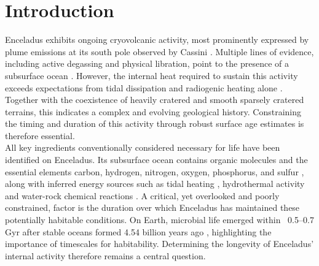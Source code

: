 \documentclass[preprint,11pt,3p,times,authoryear]{elsarticle}
\begin{document}
\linenumbers

\section{Introduction}
\label{intro}

Enceladus exhibits ongoing cryovolcanic activity, most prominently expressed by plume emissions at its south pole observed by Cassini \citep{Porco2004,Spencer2006}. Multiple lines of evidence, including active degassing and physical libration, point to the presence of a subsurface ocean \citep{Thomas2016,Nimmo2023}. However, the internal heat required to sustain this activity exceeds expectations from tidal dissipation and radiogenic heating alone \citep{Meyer2007,Roberts2008}. Together with the coexistence of heavily cratered and smooth sparsely cratered terrains, this indicates a complex and evolving geological history. Constraining the timing and duration of this activity through robust surface age estimates is therefore essential.\\

All key ingredients conventionally considered necessary for life have been identified on Enceladus. Its subsurface ocean contains organic molecules \citep{Peter2024} and the essential elements carbon, hydrogen, nitrogen, oxygen, phosphorus, and sulfur \citep{Hsu2015,Sekine2015,Bouquet2015,Choblet2017,Nimmo2018}, along with inferred energy sources such as tidal heating \citep{Thomas2016,Nimmo2023}, hydrothermal activity and water-rock chemical reactions \citep{Waite2017,Deamer2017,Choblet2017}. A critical, yet overlooked and poorly constrained, factor is the duration over which Enceladus has maintained these potentially habitable conditions. On Earth, microbial life emerged within ~0.5–0.7 Gyr after stable oceans formed 4.54 billion years ago \citep{Wilde2001,Nutman2016,Bell2015}, highlighting the importance of timescales for habitability. Determining the longevity of Enceladus’ internal activity therefore remains a central question.\\
\end{document}
